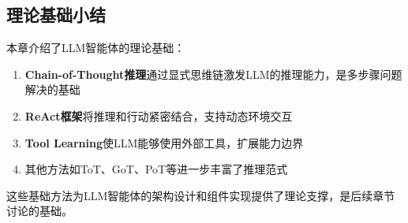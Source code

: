 \subsection{理论基础小结}

本章介绍了LLM智能体的理论基础：

\begin{enumerate}[leftmargin=2em]
    \item \textbf{Chain-of-Thought推理}通过显式思维链激发LLM的推理能力，是多步骤问题解决的基础
    \item \textbf{ReAct框架}将推理和行动紧密结合，支持动态环境交互
    \item \textbf{Tool Learning}使LLM能够使用外部工具，扩展能力边界
    \item 其他方法如ToT、GoT、PoT等进一步丰富了推理范式
\end{enumerate}

这些基础方法为LLM智能体的架构设计和组件实现提供了理论支撑，是后续章节讨论的基础。
